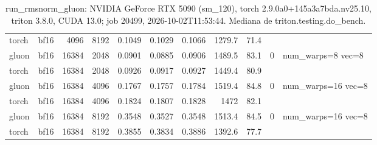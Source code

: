 \begin{table}[htbp]
\begin{tabular}{llrrrrrrrll}
    torch & bf16 & 4096 & 8192 & 0.1049 & 0.1029 & 0.1066 & 1279.7 & 71.4 &  &  \\
    gluon & bf16 & 16384 & 2048 & 0.0901 & 0.0885 & 0.0906 & 1489.5 & 83.1 & 0 & num\_warps=8 vec=8 \\
    torch & bf16 & 16384 & 2048 & 0.0926 & 0.0917 & 0.0927 & 1449.4 & 80.9 &  &  \\
    gluon & bf16 & 16384 & 4096 & 0.1767 & 0.1757 & 0.1784 & 1519.4 & 84.8 & 0 & num\_warps=16 vec=8 \\
    torch & bf16 & 16384 & 4096 & 0.1824 & 0.1807 & 0.1828 & 1472 & 82.1 &  &  \\
    gluon & bf16 & 16384 & 8192 & 0.3548 & 0.3527 & 0.3548 & 1513.4 & 84.5 & 0 & num\_warps=16 vec=8 \\
    torch & bf16 & 16384 & 8192 & 0.3855 & 0.3834 & 0.3886 & 1392.6 & 77.7 &  &  \\
    \bottomrule
  \end{tabular}
  \caption{run\_rmsnorm\_gluon: NVIDIA GeForce RTX 5090 (sm\_120), torch 2.9.0a0+145a3a7bda.nv25.10, triton 3.8.0, CUDA 13.0; job 20499, 2026-10-02T11:53:44. Mediana de triton.testing.do\_bench.}
  \label{tab:pascal-run-rmsnorm-gluon}
\end{table}
